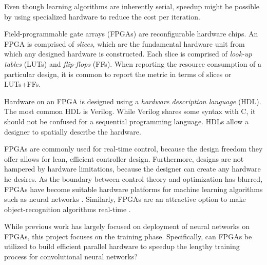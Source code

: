 Even though learning algorithms are inherently serial, speedup might be possible by using specialized hardware to reduce the cost per iteration.

Field-programmable gate arrays (FPGAs) are reconfigurable hardware chips. An FPGA is comprised of \textit{slices}, which are the fundamental hardware unit from which any designed hardware is constructed. Each slice is comprised of \textit{look-up tables} (LUTs) and \textit{flip-flops} (FFs). When reporting the resource consumption of a particular design, it is common to report the metric in terms of slices or LUTs+FFs.

Hardware on an FPGA is designed using a \textit{hardware description language} (HDL). The most common HDL is Verilog. While Verilog shares some syntax with C, it should not be confused for a sequential programming language. HDLs allow a designer to spatially describe the hardware.

FPGAs are commonly used for real-time control, because the design freedom they offer allows for lean, efficient controller design. Furthermore, designs are not hampered by hardware limitations, because the designer can create any hardware he desires. As the boundary between control theory and optimization has blurred, FPGAs have become suitable hardware platforms for machine learning algorithms such as neural networks \cite{wang2008} \cite{skodzik2013}. Similarly, FPGAs are an attractive option to make object-recognition algorithms real-time \cite{ahn2015}.

While previous work has largely focused on deployment of neural networks on FPGAs, this project focuses on the training phase. Specifically, can FPGAs be utilized to build efficient parallel hardware to speedup the lengthy training process for convolutional neural networks?